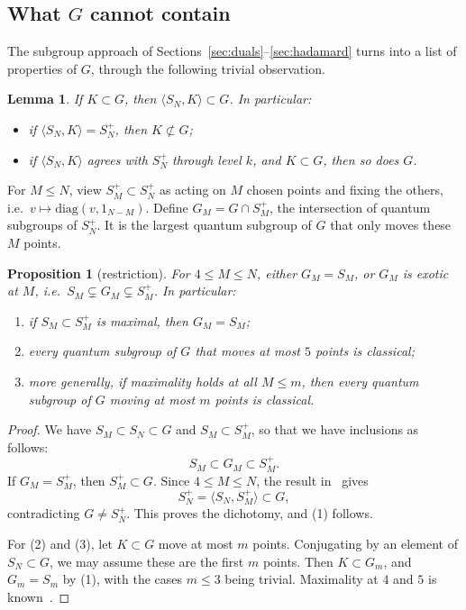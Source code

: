 \documentclass[11pt]{amsart}
\newtheorem{proposition}[theorem]{Proposition}
\newtheorem{lemma}[theorem]{Lemma}
\theoremstyle{definition}
\theoremstyle{remark}
\theoremstyle{plain}
\numberwithin{equation}{section}
\numberwithin{table}{section}
\begin{document}
\subsection{What $G$ cannot contain}

The subgroup approach of Sections~\ref{sec:duals}--\ref{sec:hadamard} turns into a list of properties of $G$, through the following trivial observation.

\begin{lemma}\label{lem:contain}
If $K\subset G$, then $\langle S_N,K\rangle\subset G$. In particular:
\begin{itemize}
\item if $\langle S_N,K\rangle=S_N^+$, then $K\not\subset G$;
\item if $\langle S_N,K\rangle$ agrees with $S_N^+$ through level $k$, and $K\subset G$, then so does $G$.
\end{itemize}
\end{lemma}

For $M\le N$, view $S_M^+\subset S_N^+$ as acting on $M$ chosen points and fixing the others, i.e.\ $v\mapsto\mathrm{diag}(v,1_{N-M})$. Define $G_M=G\cap S_M^+$, the intersection of quantum subgroups of $S_N^+$. It is the largest quantum subgroup of $G$ that only moves these $M$ points.

\begin{proposition}[restriction]\label{prop:restriction}
For $4\le M\le N$, either $G_M=S_M$, or $G_M$ is exotic at $M$, i.e.\ $S_M\subsetneq G_M\subsetneq S_M^+$. In particular:
\begin{enumerate}
\item if $S_M\subset S_M^+$ is maximal, then $G_M=S_M$;
\item every quantum subgroup of $G$ that moves at most $5$ points is classical;
\item more generally, if maximality holds at all $M\le m$, then every quantum subgroup of $G$ moving at most $m$ points is classical.
\end{enumerate}
\end{proposition}

\begin{proof}
We have $S_M\subset S_N\subset G$ and $S_M\subset S_M^+$, so that we have inclusions as follows:
\[
S_M\subset G_M\subset S_M^+ .
\]
If $G_M=S_M^+$, then $S_M^+\subset G$. Since $4\le M\le N$, the result in~\cite[Cor.~3.4]{bcf} gives
\[
S_N^+=\langle S_N,S_M^+\rangle\subset G ,
\]
contradicting $G\ne S_N^+$. This proves the dichotomy, and (1) follows.

For (2) and (3), let $K\subset G$ move at most $m$ points. Conjugating by an element of $S_N\subset G$, we may assume these are the first $m$ points. Then $K\subset G_m$, and $G_m=S_m$ by (1), with the cases $m\le3$ being trivial. Maximality at $4$ and $5$ is known~\cite{bah,bb}.
\end{proof}
\end{document}
